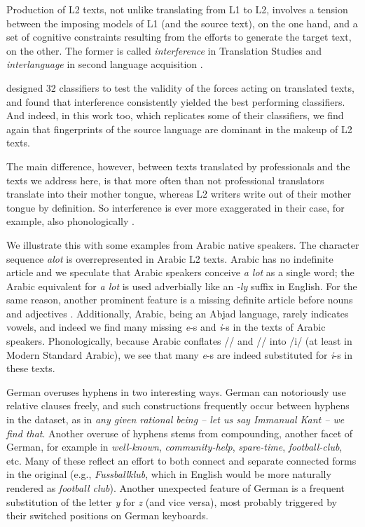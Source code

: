 \documentclass[11pt,letterpaper]{article}
\newcommand{\textnl}{\textsl}
\begin{document}
Production of L2 texts, not unlike translating from L1 to L2, involves
a tension between the imposing models of L1 (and the source text), on
the one hand, and a set of cognitive constraints resulting from the
efforts to generate the target text, on the other. The former is
called \emph{interference} in Translation Studies \citep{Toury:1995}
and \emph{interlanguage} in second language acquisition
\citep{Selinker1972}.

\citet{vered:noam:shuly} designed 32 classifiers to test the validity
of the forces acting on translated texts, and found that interference
consistently yielded the best performing classifiers. And indeed, in
this work too, which replicates some of their classifiers, we find
again that fingerprints of the source language are dominant in the
makeup of L2 texts.

The main difference, however, between texts translated by
professionals and the texts we address here, is that more often than
not professional translators translate into their mother tongue,
whereas L2 writers write out of their mother tongue by definition. So
interference is ever more exaggerated in their case, for example, also
phonologically \citep{tsur-rappoport:2007:Cognitive-2007}.

We illustrate this with some examples from Arabic native speakers. The
character sequence \textnl{alot} is overrepresented in Arabic L2
texts. Arabic has no indefinite article and we speculate that Arabic
speakers conceive \textnl{a lot} as a single word; the Arabic
equivalent for \textnl{a lot} is used adverbially like an \textnl{-ly}
suffix in English. For the same reason, another prominent feature is a
missing definite article before nouns and adjectives . Additionally,
Arabic, being an Abjad language, rarely indicates vowels, and indeed
we find many missing \textnl{e}-s and \textnl{i}-s in the texts of
Arabic speakers. Phonologically, because Arabic conflates
// and // into /i/ (at least in Modern Standard
Arabic), we see that many \textnl{e}-s are indeed substituted for
\textnl{i}-s in these texts.

German overuses hyphens in two interesting ways. German can
notoriously use relative clauses freely, and such constructions
frequently occur between hyphens in the dataset, as in \textnl{any
  given rational being -- let us say Immanual Kant -- we find
  that}. Another overuse of hyphens stems from compounding, another
facet of German, for example in \textnl{well-known},
\textnl{community-help}, \textnl{spare-time}, \textnl{football-club},
etc. Many of these reflect an effort to both connect and separate
connected forms in the original (e.g., \textnl{Fussballklub}, which in
English would be more naturally rendered as \textnl{football club}).
Another unexpected feature of German is a frequent substitution of the
letter \textnl{y} for \textnl{z} (and vice versa), most probably
triggered by their switched positions on German keyboards.
 
\end{document}
